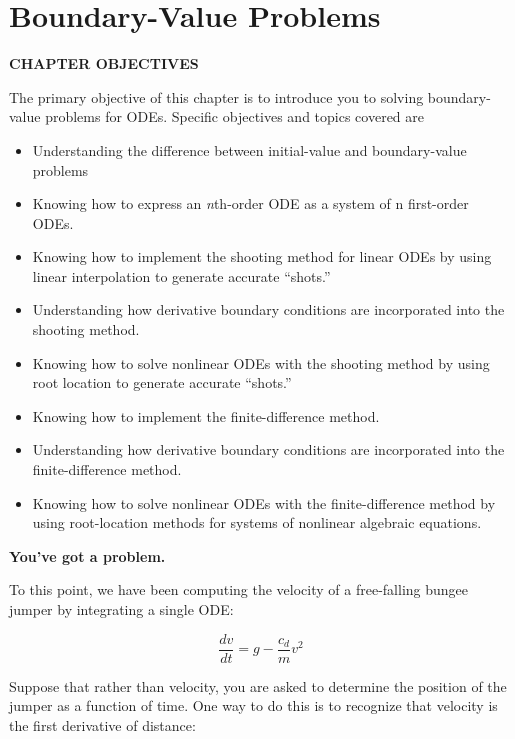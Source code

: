 \documentclass[../main.tex]{subfiles}
\begin{document}
\chapter{Boundary-Value Problems}

\begin{center}
    \Large{\textbf{CHAPTER OBJECTIVES}}
\end{center}
The primary objective of this chapter is to introduce you to solving boundary-value
problems for ODEs. Specific objectives and topics covered are
\begin{itemize}
    \item Understanding the difference between initial-value and boundary-value problems
    \item Knowing how to express an \textit{n}th-order ODE as a system of n first-order ODEs.
    \item Knowing how to implement the shooting method for linear ODEs by using linear
    interpolation to generate accurate ``shots.''
    \item Understanding how derivative boundary conditions are incorporated into the
    shooting method.
    \item Knowing how to solve nonlinear ODEs with the shooting method by using root
    location to generate accurate ``shots.''
    \item Knowing how to implement the finite-difference method.
    \item Understanding how derivative boundary conditions are incorporated into the
    finite-difference method.
    \item Knowing how to solve nonlinear ODEs with the finite-difference method by using
    root-location methods for systems of nonlinear algebraic equations.
\end{itemize}

\newpage

\noindent \large{\textbf{You've got a problem.}}

\noindent To this point, we have been computing the velocity of a free-falling bungee jumper by
integrating a single ODE:

\begin{equation}
    \tag{24.1}
    \frac{d v}{d t}=g-\frac{c_{d}}{m} v^{2}
\end{equation}

Suppose that rather than velocity, you are asked to determine the position of the jumper as
a function of time. One way to do this is to recognize that velocity is the first derivative of distance:
\end{document}
